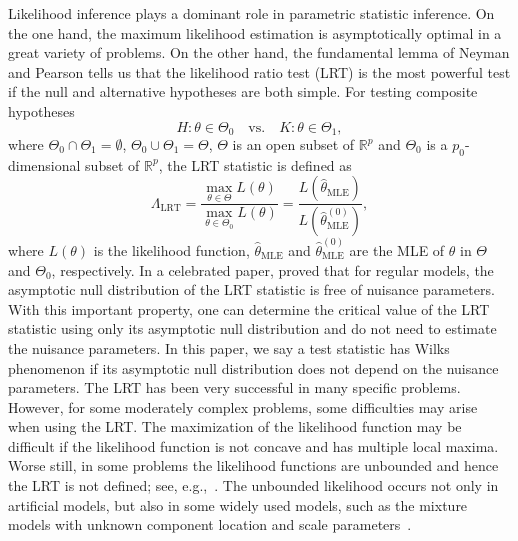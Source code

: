 \documentclass[11pt]{article}
\theoremstyle{plain}
\theoremstyle{definition}
\theoremstyle{remark}
\begin{document}
%
Likelihood inference plays a dominant role in parametric statistic inference.
On the one hand, the maximum likelihood estimation is asymptotically optimal in a great variety of problems.
On the other hand, the fundamental lemma of Neyman and Pearson tells us that the likelihood ratio test (LRT) is the most powerful test if the null and alternative hypotheses are both simple.
For testing composite hypotheses
\begin{equation}\label{eq:newHy}
    H:\theta\in\Theta_0\quad \text{vs.}\quad K: \theta\in \Theta_1,
\end{equation}
where $\Theta_0\cap \Theta_1=\emptyset$, $\Theta_0\cup \Theta_1=\Theta$, $\Theta$ is an open subset of $\mathbb{R}^p$ and $\Theta_0$ is a $p_0$-dimensional subset of $\mathbb{R}^p$,
the LRT statistic is defined as
\begin{equation*}
    \Lambda_{\text{LRT}}=\frac{\max_{\theta\in\Theta}L(\theta)}{\max_{\theta\in\Theta_0} L(\theta)}=\frac{L(\hat{\theta}_{\text{MLE}})}{ L(\hat{\theta}^{(0)}_{\text{MLE}})},
\end{equation*}
where $L(\theta)$ is the likelihood function, $\hat{\theta}_{\text{MLE}}$ and $\hat{\theta}^{(0)}_{\text{MLE}}$ are the MLE of $\theta$ in $\Theta$ and $\Theta_0$, respectively.
In a celebrated paper, \citep{Wilks1938The} proved that for regular models, the asymptotic null distribution of the LRT statistic is free of nuisance parameters.
With this important property, one can determine the critical value of the LRT statistic using only its asymptotic null distribution and do not need to estimate the nuisance parameters.
In this paper, we say a test statistic has Wilks phenomenon if its asymptotic null distribution does not depend on the nuisance parameters.
The LRT has been very successful in many specific problems.
However, for some moderately complex problems, some difficulties may arise when using the LRT.
The maximization of the likelihood function may be difficult if the likelihood function is not concave and has multiple local maxima.
Worse still, in some problems the likelihood functions are unbounded and hence the LRT is not defined; see, e.g.,~\cite{Cam1990Maximum}.
The unbounded likelihood occurs not only in artificial models, but also in some widely used models, such as the mixture models with unknown component location and scale parameters~\citep{chenjiahua2017}.
\end{document}
